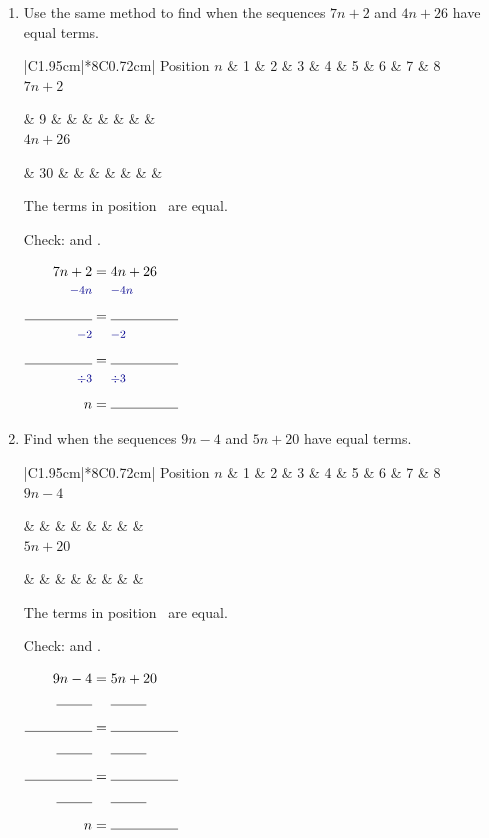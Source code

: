 \documentclass[11pt,a4paper]{article}
\makeatletter
\newcommand{\gap}{\underline{\hspace{0.95cm}}}
\newcommand{\ansline}[1][2.2cm]{\underline{\hspace{#1}}}
\newcommand{\rowstrut}{\rule[-1.9mm]{0pt}{5.8mm}}
\newenvironment{working}
  {\(\renewcommand{\arraystretch}{1.06}\begin{array}{@{}r@{\;}c@{\;}l@{}}}
  {\end{array}\)}
\newcommand{\opstyle}[1]{\text{\footnotesize\color{blue!55!black}$#1$}}
\newcommand{\bsop}[1]{\opstyle{#1} & & \opstyle{#1}\\}
\newcommand{\opgap}{\rule{0pt}{4.3mm}\rule{0.9cm}{0.4pt}}
\newcommand{\bsopgap}{\opgap & & \opgap\\}
\newcommand{\sidegap}[1][1.7cm]{\rule{0pt}{5.3mm}\rule{#1}{0.4pt}}
\newcommand{\meetlayout}[3]{%
  \begin{minipage}[c]{0.62\linewidth}\raggedright #1\par\medskip #3\end{minipage}\hfill
  \begin{minipage}[c]{0.36\linewidth}\centering #2\end{minipage}}
\newcommand{\termtable}[5][1 & 2 & 3 & 4 & 5 & 6 & 7 & 8]{%
  {\setlength{\tabcolsep}{2pt}%
  \begin{tabular}{|C{1.95cm}|*{8}{C{0.72cm}|}}\hline
  {\small Position $n$} & #1\\\hline
  #2\rowstrut & #3\\\hline
  #4\rowstrut & #5\\\hline
  \end{tabular}}}
\makeatother
\begin{document}
\begin{enumerate}
\item Use the same method to find when the sequences $7n+2$ and $4n+26$ have equal terms.\par
\meetlayout
  {\termtable{$7n+2$}{9 & & & & & & &}{$4n+26$}{30 & & & & & & &}}
  {\begin{working}
     7n+2 & = & 4n+26\\ \bsop{-4n}
     \sidegap & = & \sidegap\\ \bsop{-2}
     \sidegap & = & \sidegap\\ \bsop{\div 3}
     n & = & \sidegap
   \end{working}}
  {The terms in position \gap\ are equal.\par\smallskip
   Check: \ansline[3.4cm] and \ansline[3.4cm].}

\item Find when the sequences $9n-4$ and $5n+20$ have equal terms.\par
\meetlayout
  {\termtable{$9n-4$}{ & & & & & & &}{$5n+20$}{ & & & & & & &}}
  {\begin{working}
     9n-4 & = & 5n+20\\ \bsopgap
     \sidegap & = & \sidegap\\ \bsopgap
     \sidegap & = & \sidegap\\ \bsopgap
     n & = & \sidegap
   \end{working}}
  {The terms in position \gap\ are equal.\par\smallskip
   Check: \ansline[3.4cm] and \ansline[3.4cm].}


\end{enumerate}
\end{document}
